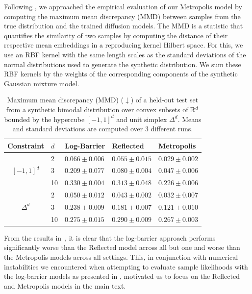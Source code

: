 Following \cite{fishman2023diffusion}, we approached the empirical evaluation of our Metropolis model by computing the maximum mean discrepancy (MMD) \parencite{gretton2012kernel} between samples from the true distribution and the trained diffusion models.
The MMD is a statistic that quantifies the similarity of two samples by computing the distance of their respective mean embeddings in a reproducing kernel Hilbert space.
For this, we use an RBF kernel with the same length scales as the standard deviations of the normal distributions used to generate the synthetic distribution.
We sum these RBF kernels by the weights of the corresponding components of the synthetic Gaussian mixture model.

\begin{table}[H]
	\caption{
		Maximum mean discrepancy (MMD) ($\downarrow$) of a held-out test set from a synthetic bimodal distribution over convex subsets of $\mathbb{R}^d$ bounded by the hypercube \([-1,1]^d\) and unit simplex \(\Delta^d\).
		Means and standard deviations are computed over 3 different runs.
	}
	\label{tab:synthetic_polytope_mmd}
	\vspace{1em}
	\centering

	\begin{tabular}{cllll}
		\toprule
		Constraint & \(d\) & {Log-Barrier}      & {Reflected}        & {Metropolis}                \\
		\midrule
		\multirow{3}{*}{$[-1,1]^d$}
		           & 2     & $0.066 \pm{0.006}$ & $0.055 \pm{0.015}$ & $\mathbf{0.029 \pm{0.002}}$ \\
		           & 3     & $0.209 \pm{0.077}$ & $0.080 \pm{0.004}$ & $\mathbf{0.047 \pm{0.006}}$ \\
		           & 10    & $0.330 \pm{0.004}$ & $0.313 \pm{0.048}$ & $\mathbf{0.226 \pm{0.006}}$ \\
		\midrule
		\multirow{3}{*}{$\Delta^d$}
		           & 2     & $0.050 \pm{0.012}$ & $0.043 \pm{0.002}$ & $\mathbf{0.032 \pm{0.007}}$ \\
		           & 3     & $0.238 \pm{0.009}$ & $0.181 \pm{0.007}$ & $\mathbf{0.121 \pm{0.010}}$ \\
		           & 10    & $0.275 \pm{0.015}$ & $0.290 \pm{0.009}$ & $\mathbf{0.267 \pm{0.003}}$ \\
		\bottomrule
	\end{tabular}
\end{table}

From the results in~, it is clear that the log-barrier approach performs significantly worse than the Reflected model across all but one and worse than the Metropolis models across all settings.
This, in conjunction with numerical instabilities we encountered when attempting to evaluate sample likelihoods with the log-barrier models as presented in \cite{fishman2023diffusion}, motivated us to focus on the Reflected and Metropolis models in the main text.

